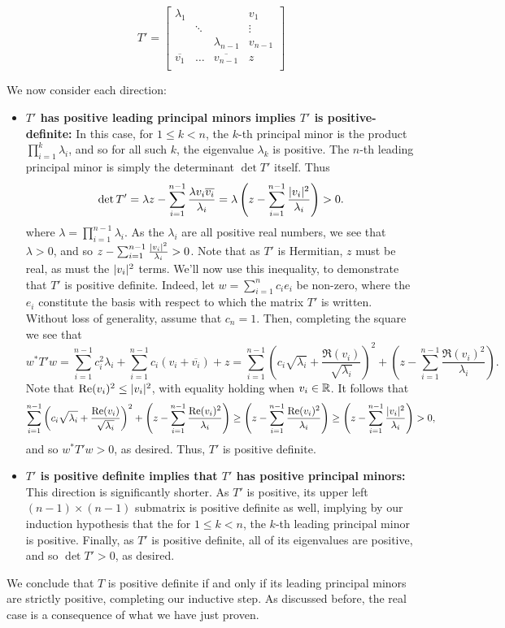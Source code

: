 \documentclass{scrartcl}
\begin{document}
\begin{solution}
    \[T'=\begin{bmatrix} 
    \lambda_1 & & & v_1 \\
        & \ddots & & \vdots \\
        & & \lambda_{n-1} & v_{n-1} \\
    \overline{v_1} & \hdots & \overline{v_{n-1}} & z \\
    \end{bmatrix}\]

    We now consider each direction:
    \begin{itemize}
        \item \textbf{$T'$ has positive leading principal minors implies $T'$ is positive-definite:} In this case, for $1\le k <n$, the $k$-th principal minor is the product $\prod_{i=1}^k \lambda_i$, and so for all such $k$, the eigenvalue $\lambda_k$ is positive. The $n$-th leading principal minor is simply the determinant $\det T'$ itself. Thus
        \[\det T'=\lambda z - \sum_{i=1}^{n-1} \frac{\lambda v_i\overline{v_i}}{\lambda_i}=\lambda\left(z - \sum_{i=1}^{n-1} \frac{ \lvert v_i\rvert^2}{\lambda_i}\right)>0.\]
        where $\lambda=\prod_{i=1}^{n-1}\lambda_i$. As the $\lambda_i$ are all positive real numbers, we see that $\lambda>0$, and so $z - \sum_{i=1}^{n-1} \frac{ \lvert v_i\rvert^2}{\lambda_i}>0$. Note that as $T'$ is Hermitian, $z$ must be real, as must the $\lvert v_i\rvert^2$ terms. We'll now use this inequality, to demonstrate that $T'$ is positive definite. Indeed, let $w=\sum_{i=1}^n c_ie_i$ be non-zero, where the $e_i$ constitute the basis with respect to which the matrix $T'$ is written. Without loss of generality, assume that $c_n=1$. Then, completing the square we see that 
        \[w^\ast T' w=\sum_{i=1}^{n-1} c_i^2\lambda_i+\sum_{i=1}^{n-1}c_i(v_i+\overline{v_i})+z=\sum_{i=1}^{n-1} \left(c_i\sqrt{\lambda_i} + \frac{\Re (v_i)}{\sqrt{\lambda_i}}\right)^2 + \left(z-\sum_{i=1}^{n-1}\frac{\Re (v_i)^2}{\lambda_i} \right).\]
        Note that $\operatorname{Re} (v_i)^2\le \lvert v_i\rvert^2$, with equality holding when $v_i\in \mathbb R$. It follows that
        \[\sum_{i=1}^{n-1} \left(c_i\sqrt{\lambda_i} + \frac{\operatorname{Re} (v_i)}{\sqrt{\lambda_i}}\right)^2 + \left(z-\sum_{i=1}^{n-1}\frac{\operatorname{Re} (v_i)^2}{\lambda_i} \right)\ge \left(z-\sum_{i=1}^{n-1}\frac{\operatorname{Re} (v_i)^2}{\lambda_i} \right) \ge \left(z-\sum_{i=1}^{n-1}\frac{\lvert v_i\rvert^2}{\lambda_i} \right)>0,\]
        and so $w^\ast T' w>0$, as desired. Thus, $T'$ is positive definite.
        
        \item \textbf{$T'$ is positive definite implies that $T'$ has positive principal minors:} This  direction is significantly shorter. As $T'$ is positive, its upper left $(n-1)\times (n-1)$ submatrix is positive definite as well, implying by our induction hypothesis that the for $1\le k < n$, the $k$-th leading principal minor is positive. Finally, as $T'$ is positive definite, all of its eigenvalues are positive, and so $\det T'>0$, as desired.
    \end{itemize}
    We conclude that $T$ is positive definite if and only if its leading principal minors are strictly positive, completing our inductive step. As discussed before, the real case is a consequence of what we have just proven.
\end{solution}
\end{document}
